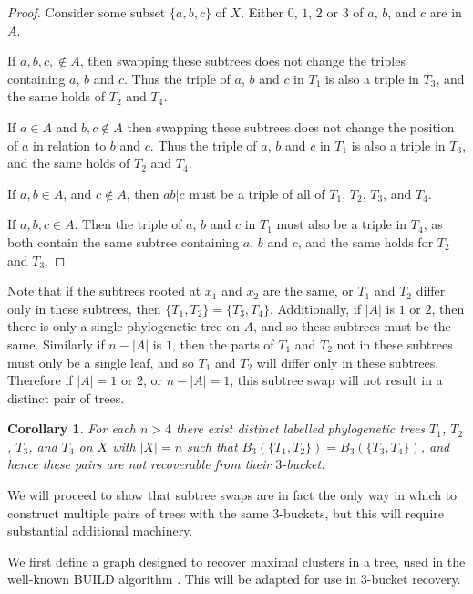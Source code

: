 \documentclass[12pt]{article}
\newtheorem{Corollary}[Theorem]{Corollary}
\theoremstyle{definition}
\begin{document}
\begin{proof}
    Consider some subset $\{a, b, c\}$ of $X$. Either $0$, $1$, $2$ or $3$ of $a$, $b$, and $c$ are in $A$.
    
    If $a, b, c, \notin A$, then swapping these subtrees does not change the triples containing $a$, $b$ and $c$. Thus the triple of $a$, $b$ and $c$ in $T_1$ is also a triple in $T_3$, and the same holds of $T_2$ and $T_4$.
    
    If $a \in A$ and $b, c \notin A$ then swapping these subtrees does not change the position of $a$ in relation to $b$ and $c$. Thus the triple of $a$, $b$ and $c$ in $T_1$ is also a triple in $T_3$, and the same holds of $T_2$ and $T_4$.
    
    If $a, b \in A$, and $c \notin A$, then $ab|c$ must be a triple of all of $T_1$, $T_2$, $T_3$, and $T_4$.
    
    If $a, b, c \in A$. Then the triple of $a$, $b$ and $c$ in $T_1$ must also be a triple in $T_4$, as both contain the same subtree containing $a$, $b$ and $c$, and the same holds for $T_2$ and $T_3$.
\end{proof}

Note that if the subtrees rooted at $x_1$ and $x_2$ are the same, or $T_1$ and $T_2$ differ only in these subtrees, then $\{T_1, T_2\} = \{T_3, T_4\}$. Additionally, if $|A|$ is $1$ or $2$, then there is only a single phylogenetic tree on $A$, and so these subtrees must be the same. Similarly if $n - |A|$ is $1$, then the parts of $T_1$ and $T_2$ not in these subtrees must only be a single leaf, and so $T_1$ and $T_2$ will differ only in these subtrees. Therefore if $|A|=1$ or $2$, or $n-|A|=1$, this subtree swap will not result in a distinct pair of trees.

\begin{Corollary}
    For each $n>4$ there exist distinct labelled phylogenetic trees $T_1$, $T_2$, $T_3$, and $T_4$ on $X$ with $|X|=n$ such that $B_3(\{T_1, T_2\}) = B_3(\{T_3, T_4\})$, and hence these pairs are not recoverable from their $3$-bucket.
\end{Corollary}

We will proceed to show that subtree swaps are in fact the only way in which to construct multiple pairs of trees with the same $3$-buckets, but this will require substantial additional machinery. 

We first define a graph designed to recover maximal clusters in a tree, used in the well-known BUILD algorithm \cite{aho1981inferring}. This will be adapted for use in $3$-bucket recovery.
\end{document}
